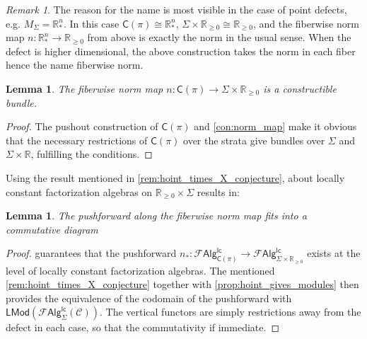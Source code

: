 \documentclass[12pt,a4paper]{article}
\newcounter{counter} \numberwithin{counter}{section}
\theoremstyle{definition}
\theoremstyle{plain}
\newtheorem{lemma}[counter]{Lemma}
\theoremstyle{remark}
\newtheorem{remark}[counter]{Remark}
\newcommand{\catC}{\mathscr{C}}
\newcommand{\lcfa}{\mathscr{F} \mathsf{Alg}^{\mathsf{lc}}}
\newcommand{\alg}[1]{\mathscr{A} \mathsf{lg}_{#1}}
\newcommand{\hoint}{\mathbb{R}_{\geq 0}}
\begin{document}
\begin{remark}
    The reason for the name is most visible in the case of point defects, e.g. $M_{\Sigma} = \mathbb{R}^n_{*}$. In this case $\mathsf{C}(\pi) \cong \mathbb{R}^n_{*}$, $\Sigma \times \hoint \cong \hoint$, and the fiberwise norm map $n: \mathbb{R}^n_{*} \rightarrow \hoint$ from above is exactly the norm in the usual sense. When the defect is higher dimensional, the above construction takes the norm in each fiber hence the name fiberwise norm.
\end{remark}

\begin{lemma}\label{lem:n_is_bundle}
    The fiberwise norm map $n: \mathsf{C}(\pi) \rightarrow \Sigma \times \hoint$ is a constructible bundle.
\end{lemma}

\begin{proof}
    The pushout construction of $\mathsf{C}(\pi)$ and \cref{con:norm_map} make it obvious that the necessary restrictions of $\mathsf{C}(\pi)$ over the strata give bundles over $\Sigma$ and $\Sigma \times \mathbb{R}$, fulfilling the conditions.
\end{proof}

Using the result mentioned in \cref{rem:hoint_times_X_conjecture}, about locally constant factorization algebras on $\hoint \times \Sigma$ results in:

\begin{lemma}
    The pushforward along the fiberwise norm map fits into a commutative diagram
    \begin{center}
    \end{center}
\end{lemma}

\begin{proof}
     guarantees that the pushforward $n_*: \lcfa_{\mathsf{C}(\pi)} \rightarrow \lcfa_{\Sigma \times \hoint}$ exists at the level of locally constant factorization algebras. The mentioned \cref{rem:hoint_times_X_conjecture} together with \cref{prop:hoint_gives_modules} then provides the equivalence of the codomain of the pushforward with $\mathsf{LMod} (\lcfa_{\Sigma} (\catC))$. The vertical functors are simply restrictions away from the defect in each case, so that the commutativity if immediate.
\end{proof}
\end{document}
